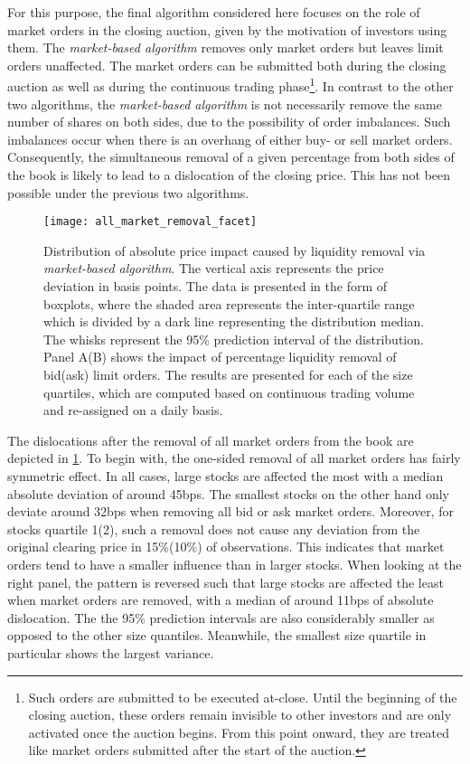 \documentclass[11pt,a4paper]{article}
\begin{document}
    For this purpose, the final algorithm considered here focuses on the role of market orders in the closing auction, given by the motivation of investors using them. The \textit{market-based algorithm} removes only market orders but leaves limit orders unaffected. The market orders can be submitted both during the closing auction as well as during the continuous trading phase\footnote{Such orders are submitted to be executed at-close. Until the beginning of the closing auction, these orders remain invisible to other investors and are only activated once the auction begins. From this point onward, they are treated like market orders submitted after the start of the auction.}. In contrast to the other two algorithms, the \textit{market-based algorithm} is not necessarily remove the same number of shares on both sides, due to the possibility of order imbalances. Such imbalances occur when there is an overhang of either buy- or sell market orders. Consequently, the simultaneous removal of a given percentage from both sides of the book is likely to lead to a dislocation of the closing price. This has not been possible under the previous two algorithms.

    \begin{figure}[t!]
        \centering
        \texttt{[image: all\_market\_removal\_facet]}
        \caption{Distribution of absolute price impact caused by liquidity removal via \textit{market-based algorithm}. The vertical axis represents the price deviation in basis points. The data is presented in the form of boxplots, where the shaded area represents the inter-quartile range which is divided by a dark line representing the distribution median. The whisks represent the 95\% prediction interval of the distribution. Panel A(B) shows the impact of percentage liquidity removal of bid(ask) limit orders. The results are presented for each of the size quartiles, which are computed based on continuous trading volume and re-assigned on a daily basis.}
        \label{fig:SensMkt}
    \end{figure}

    The dislocations after the removal of all market orders from the book are depicted in \cref{fig:SensMkt}. To begin with, the one-sided removal of all market orders has fairly symmetric effect. In all cases, large stocks are affected the most with a median absolute deviation of around 45bps. The smallest stocks on the other hand only deviate around 32bps when removing all bid or ask market orders. Moreover, for stocks quartile 1(2), such a removal does not cause any deviation from the original clearing price in 15\%(10\%) of observations. This indicates that market orders tend to have a smaller influence than in larger stocks. When looking at the right panel, the pattern is reversed such that large stocks are affected the least when market orders are removed, with a median of around 11bps of absolute dislocation. The the 95\% prediction intervals are also considerably smaller as opposed to the other size quantiles. Meanwhile, the smallest size quartile in particular shows the largest variance.
\end{document}
